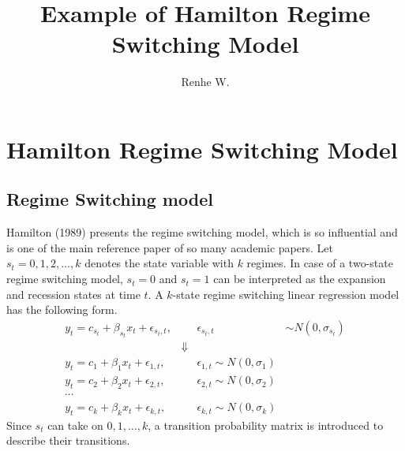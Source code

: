 \documentclass[UTF8,12pt]{ctexart}
\title{Example of Hamilton Regime Switching Model}
\author{Renhe W.}
\date{ }
\numberwithin{equation}{section}%
\begin{document}
	
	\maketitle
	\tableofcontents %
	\listoffigures %
	\listoftables %
	\newpage
	\kaishu
	
	\section{Hamilton Regime Switching Model}
	
	\subsection{Regime Switching model}
	Hamilton (1989) presents the regime switching model, which is so influential and is one of the main reference paper of so many academic papers. Let $s_t=0,1,2, \ldots, k$ denotes the state variable with $k$ regimes. In case of a two-state regime switching model, $s_t=0$ and $s_t=1$ can be interpreted as the expansion and recession states at time $t$. A $k$-state regime switching linear regression model has the following form.
	$$
	\begin{array}{rlrl}
		y_t=c_{s_t}+\beta_{s_t} x_t+\epsilon_{s_t, t}, & & \epsilon_{s_t, t} & \sim N\left(0, \sigma_{s_t}\right) \\
		& \Downarrow & & \\
		y_t=c_1+\beta_1 x_t+\epsilon_{1, t}, & & \epsilon_{1, t} \sim N\left(0, \sigma_1\right) \\
		y_t=c_2+\beta_2 x_t+\epsilon_{2, t}, & & \epsilon_{2, t} \sim N\left(0, \sigma_2\right) \\
		\cdots & & \\
		y_t=c_k+\beta_k x_t+\epsilon_{k, t}, & & \epsilon_{k, t} \sim N\left(0, \sigma_k\right)
	\end{array}
	$$
	Since $s_t$ can take on $0,1, \ldots, k$, a transition probability matrix is introduced to describe their transitions.
\end{document}
